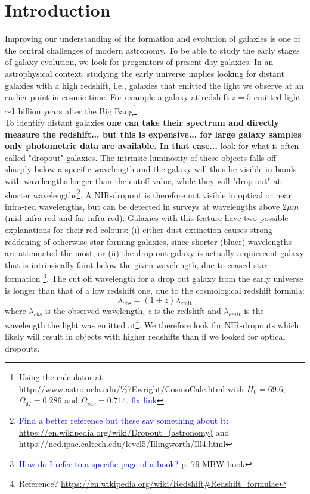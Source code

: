 \section{Introduction}
Improving our understanding of the formation and evolution of galaxies is one of the central challenges of modern astronomy. To be able to study the early stages of galaxy evolution, we look for progenitors of present-day galaxies. In an astrophysical context, studying the early universe implies looking for distant galaxies with a high redshift, i.e., galaxies that emitted the light we observe at an earlier point in cosmic time. For example a galaxy at redshift $z=5$ emitted light $\sim1$ billion years after the Big Bang\footnote{Using the calculator at \url{http://www.astro.ucla.edu/\%7Ewright/CosmoCalc.html} with $H_0=69.6$, $\Omega_M=0.286$ and $\Omega_{vac}=0.714$. \textcolor{blue}{fix link}}. \\

To identify distant galaxies \textbf{ one can take their spectrum and directly measure the redshift... but this is expensive... for large galaxy samples only photometric data are available. In that case...} look for what is often called "dropout" galaxies. The intrinsic luminosity of these objects falls off sharply below a specific wavelength and the galaxy will thus be visible in bands with wavelengths longer than the cutoff value, while they will "drop out" at shorter wavelengths\footnote{ \textcolor{blue}{Find a better reference but these say something about it:} \url{https://en.wikipedia.org/wiki/Dropout_(astronomy)} and \url{https://ned.ipac.caltech.edu/level5/Illingworth/Ill4.html}}.
A NIR-dropout is therefore not visible in optical or near infra-red wavelengths, but can be detected in surveys at wavelengths above $2 \si{\mu m}$ (mid infra red and far infra red). Galaxies with this feature have two possible explanations for their red colours: (i) either dust extinction causes strong reddening of otherwise star-forming galaxies, since shorter (bluer) wavelengths are attenuated the most, or (ii) the drop out galaxy is actually a quiescent galaxy that is intrinsically faint below the given wavelength, due to ceased star formation \footnote{\textcolor{blue}{How do I refer to a specific page of a book?} p. 79 MBW book }. The cut off wavelength for a drop out galaxy from the early universe is longer than that of a low redshift one, due to the cosmological redshift formula:
\begin{equation}
    \lambda_\mathrm{obs} = (1+z)  \lambda_\mathrm{emit}
\end{equation}
where $\lambda_{obs}$ is the observed wavelength, $z$ is the redshift and $\lambda_{emit}$ is the wavelength the light was emitted at\footnote{Reference? \url{https://en.wikipedia.org/wiki/Redshift#Redshift_formulae} }. We therefore look for NIR-dropouts which likely will result in objects with higher redshifts than if we looked for optical dropouts.\\

